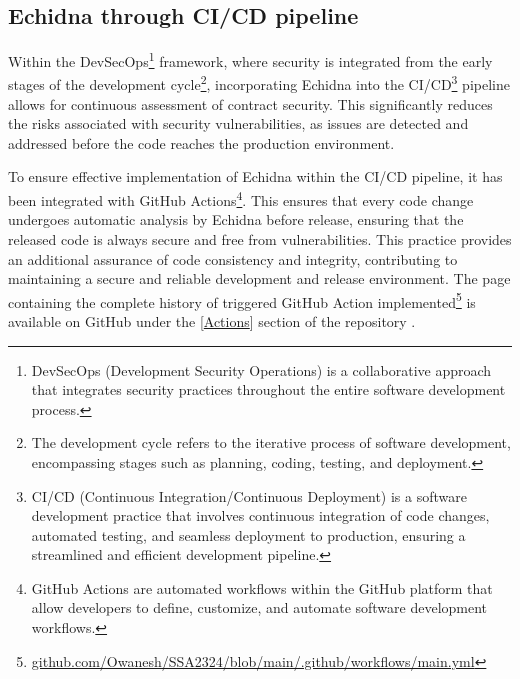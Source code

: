 \documentclass{article}
\begin{document}
\subsection{Echidna through CI/CD pipeline}
Within the DevSecOps\footnote{DevSecOps (Development Security Operations)  is a collaborative approach that integrates security practices throughout the entire software development process.} framework, where security is integrated from the early stages of the development cycle\footnote{The development cycle refers to the iterative process of software development, encompassing stages such as planning, coding, testing, and deployment.}, incorporating Echidna into the CI/CD\footnote{CI/CD (Continuous Integration/Continuous Deployment) is a software development practice that involves continuous integration of code changes, automated testing, and seamless deployment to production, ensuring a streamlined and efficient development pipeline.} pipeline allows for continuous assessment of contract security. This significantly reduces the risks associated with security vulnerabilities, as issues are detected and addressed before the code reaches the production environment.

To ensure effective implementation of Echidna within the CI/CD pipeline, it has been integrated with GitHub Actions\footnote{GitHub Actions are automated workflows within the GitHub platform that allow developers to define, customize, and automate software development workflows.}. This ensures that every code change undergoes automatic analysis by Echidna before release, ensuring that the released code is always secure and free from vulnerabilities. This practice provides an additional assurance of code consistency and integrity, contributing to maintaining a secure and reliable development and release environment.
The page containing the complete history of triggered GitHub Action implemented\footnote{\href{https://github.com/Owanesh/SSA2324/blob/main/.github/workflows/main.yml}{github.com/Owanesh/SSA2324/blob/main/.github/workflows/main.yml}} is available on GitHub under the [\href{https://github.com/Owanesh/SSA2324/actions}{Actions}] section of the repository .
\end{document}
